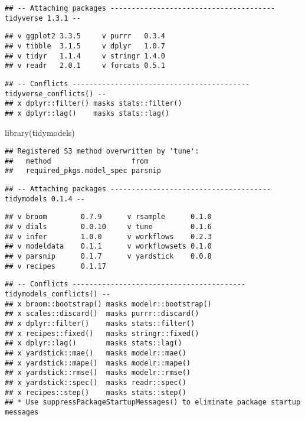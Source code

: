 \documentclass[
]{article}
\newenvironment{Shaded}{\begin{snugshade}}{\end{snugshade}}
\newcommand{\FunctionTok}[1]{\textcolor[rgb]{0.00,0.00,0.00}{#1}}
\newcommand{\NormalTok}[1]{#1}
\begin{document}
\begin{verbatim}
## -- Attaching packages --------------------------------------- tidyverse 1.3.1 --
\end{verbatim}

\begin{verbatim}
## v ggplot2 3.3.5     v purrr   0.3.4
## v tibble  3.1.5     v dplyr   1.0.7
## v tidyr   1.1.4     v stringr 1.4.0
## v readr   2.0.1     v forcats 0.5.1
\end{verbatim}

\begin{verbatim}
## -- Conflicts ------------------------------------------ tidyverse_conflicts() --
## x dplyr::filter() masks stats::filter()
## x dplyr::lag()    masks stats::lag()
\end{verbatim}

\begin{Shaded}
\begin{Highlighting}[]
\FunctionTok{library}\NormalTok{(tidymodels)}
\end{Highlighting}
\end{Shaded}

\begin{verbatim}
## Registered S3 method overwritten by 'tune':
##   method                   from   
##   required_pkgs.model_spec parsnip
\end{verbatim}

\begin{verbatim}
## -- Attaching packages -------------------------------------- tidymodels 0.1.4 --
\end{verbatim}

\begin{verbatim}
## v broom        0.7.9      v rsample      0.1.0 
## v dials        0.0.10     v tune         0.1.6 
## v infer        1.0.0      v workflows    0.2.3 
## v modeldata    0.1.1      v workflowsets 0.1.0 
## v parsnip      0.1.7      v yardstick    0.0.8 
## v recipes      0.1.17
\end{verbatim}

\begin{verbatim}
## -- Conflicts ----------------------------------------- tidymodels_conflicts() --
## x broom::bootstrap() masks modelr::bootstrap()
## x scales::discard()  masks purrr::discard()
## x dplyr::filter()    masks stats::filter()
## x recipes::fixed()   masks stringr::fixed()
## x dplyr::lag()       masks stats::lag()
## x yardstick::mae()   masks modelr::mae()
## x yardstick::mape()  masks modelr::mape()
## x yardstick::rmse()  masks modelr::rmse()
## x yardstick::spec()  masks readr::spec()
## x recipes::step()    masks stats::step()
## * Use suppressPackageStartupMessages() to eliminate package startup messages
\end{verbatim}
\end{document}
